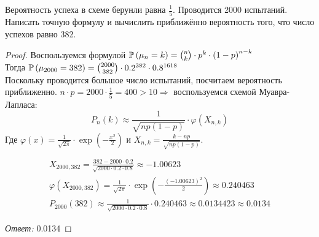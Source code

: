 \begin{problem}
Вероятность успеха в схеме берунли равна $ \frac{1}{5} $. Проводится 2000 испытаний. Написать точную формулу и вычислить приближённо вероятность того, что число успехов равно 382.
\end{problem}

\begin{proof}
Воспользуемся формулой $ \mathbb P\left(\mu_n = k\right) = \binom{n}{k}\cdot p^k\cdot\left(1-p\right)^{n-k} $\\
Тогда $ \mathbb P\left(\mu_{2000} = 382\right) = \binom{2000}{382}\cdot 0.2^{382}\cdot 0.8^{1618} $\\
Поскольку проводится большое число испытаний, посчитаем вероятность приближенно.
$ n\cdot p = 2000\cdot\frac{1}{5} = 400 > 10 \Rightarrow $ воспользуемся схемой Муавра-Лапласа:
\[
P_n\left(k\right) \approx \frac{1}{\sqrt{np(1-p)}}\cdot\varphi(X_{n,k})
\]
Где $ \varphi(x) = \frac{1}{\sqrt{2\pi}}\cdot\exp{\left(-\frac{x^2}{2}\right)} $ и $ X_{n,k} = \frac{k - np}{\sqrt{np(1-p)}} $.

\begin{gather*}
    X_{2000, 382} = \frac{382 - 2000\cdot 0.2}{\sqrt{2000\cdot 0.2\cdot 0.8}} \approx -1.00623 \\
    \varphi(X_{2000,382}) =  \frac{1}{\sqrt{2\pi}}\cdot\exp{\left(-\frac{(-1.00623)^2}{2}\right)} \approx 0.240463\\
    P_{2000}\left(382\right) \approx \frac{1}{\sqrt{2000\cdot 0.2\cdot 0.8}} \cdot 0.240463 \approx 0.0134423 \approx 0.0134
\end{gather*}

{\it Ответ:} 0.0134
\end{proof}